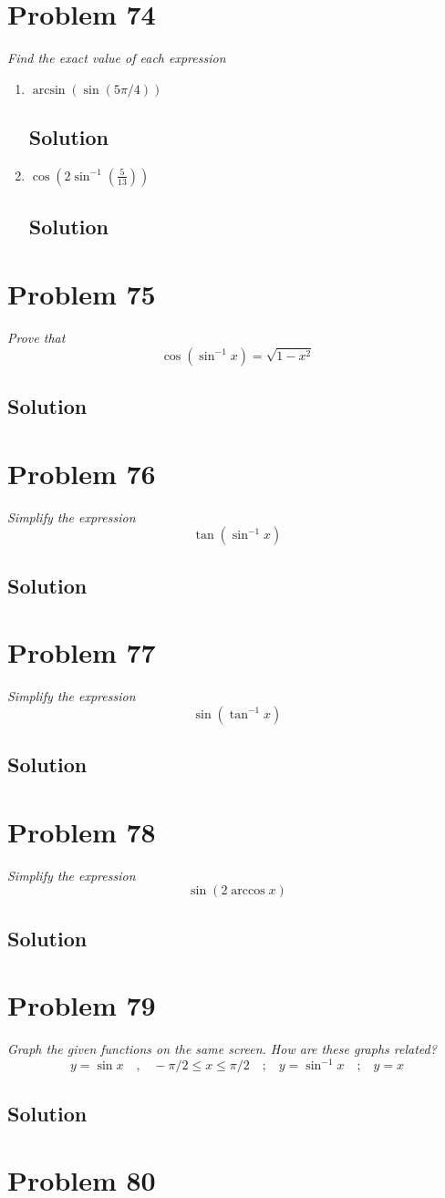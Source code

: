 \documentclass[11pt]{article}
\newcommand{\soln}{\subsection*}
\newcommand{\qn}{\textit}
\newcommand{\eqtext}[1]{\quad\text{#1}\quad}
\begin{document}
\section*{Problem 74}

\qn{Find the exact value of each expression}
\begin{enumerate}
	\item \qn{$\arcsin(\sin(5\pi/4))$}
	\soln{Solution}
	
	\item \qn{$\cos(2\sin^{-1}(\frac{5}{13}))$}
	\soln{Solution}
\end{enumerate}

\section*{Problem 75}

\qn{Prove that $$\cos(\sin^{-1}x)=\sqrt{1-x^2}$$}

\soln{Solution}

\section*{Problem 76}

\qn{Simplify the expression $$\tan(\sin^{-1}x)$$}

\soln{Solution}

\section*{Problem 77}

\qn{Simplify the expression $$\sin(\tan^{-1}x)$$}

\soln{Solution}

\section*{Problem 78}

\qn{Simplify the expression $$\sin(2\arccos{x})$$}

\soln{Solution}

\section*{Problem 79}

\qn{Graph the given functions on the same screen. How are these graphs related? $$y=\sin{x} \eqtext{,} -\pi/2 \le x \le \pi/2 \eqtext{;} y=\sin^{-1}x \eqtext{;} y=x$$}
\soln{Solution}

\section*{Problem 80}
\end{document}
